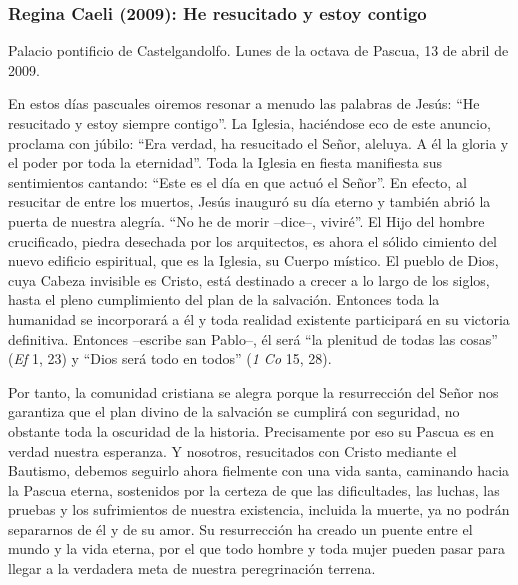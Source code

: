 			\subsubsection{Regina Caeli (2009): He resucitado y estoy contigo}
			
			\begin{referencia}Palacio pontificio de Castelgandolfo. Lunes de la octava de Pascua, 13 de abril de 2009.\end{referencia}
			
			\begin{body}En estos días pascuales oiremos resonar a menudo las palabras de Jesús: “He resucitado y estoy siempre contigo”. La Iglesia, haciéndose eco de este anuncio, proclama con júbilo: “Era verdad, ha resucitado el Señor, aleluya. A él la gloria y el poder por toda la eternidad”. Toda la Iglesia en fiesta manifiesta sus sentimientos cantando: “Este es el día en que actuó el Señor”. En efecto, al resucitar de entre los muertos, Jesús inauguró su día eterno y también abrió la puerta de nuestra alegría. “No he de morir –dice–, viviré”. El Hijo del hombre crucificado, piedra desechada por los arquitectos, es ahora el sólido cimiento del nuevo edificio espiritual, que es la Iglesia, su Cuerpo místico. El pueblo de Dios, cuya Cabeza invisible es Cristo, está destinado a crecer a lo largo de los siglos, hasta el pleno cumplimiento del plan de la salvación. Entonces toda la humanidad se incorporará a él y toda realidad existente participará en su victoria definitiva. Entonces –escribe san Pablo–, él será “la plenitud de todas las cosas” (\textit{Ef} 1, 23) y “Dios será todo en todos” (\textit{1 Co} 15, 28). \end{body}
			
			\begin{body}Por tanto, la comunidad cristiana se alegra porque la resurrección del Señor nos garantiza que el plan divino de la salvación se cumplirá con seguridad, no obstante toda la oscuridad de la historia. Precisamente por eso su Pascua es en verdad nuestra esperanza. Y nosotros, resucitados con Cristo mediante el Bautismo, debemos seguirlo ahora fielmente con una vida santa, caminando hacia la Pascua eterna, sostenidos por la certeza de que las dificultades, las luchas, las pruebas y los sufrimientos de nuestra existencia, incluida la muerte, ya no podrán separarnos de él y de su amor. Su resurrección ha creado un puente entre el mundo y la vida eterna, por el que todo hombre y toda mujer pueden pasar para llegar a la verdadera meta de nuestra peregrinación terrena. \end{body}
			
